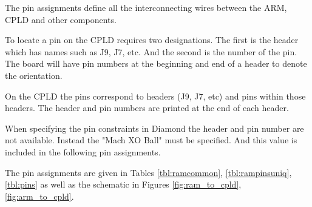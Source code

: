 \documentclass{article}
\begin{document}
The pin assignments define all the interconnecting wires
between the ARM, CPLD and other components.

To locate a pin on the CPLD requires two designations\citep[Pg. 11-14]{EB66}.
The first is the header which has names such as J9, J7, etc.
And the second is the number of the pin.
The board will have pin numbers at the beginning and end of a header
to denote the orientation.

On the CPLD the pins correspond to headers (J9, J7, etc)
and pins within those headers\citep[Pg. 11-14]{EB66}.
The header and pin numbers are printed at the end of each header.

When specifying the pin constraints in Diamond\cite{Diamond}
the header and pin number are not available.
Instead the "Mach XO Ball" must be specified.
And this value is included in the following pin assignments.

The pin assignments are given in Tables
\ref{tbl:ramcommon}, \ref{tbl:rampinsuniq}, \ref{tbl:pins}
as well as the schematic in Figures \ref{fig:ram_to_cpld}, \ref{fig:arm_to_cpld}.
\end{document}
